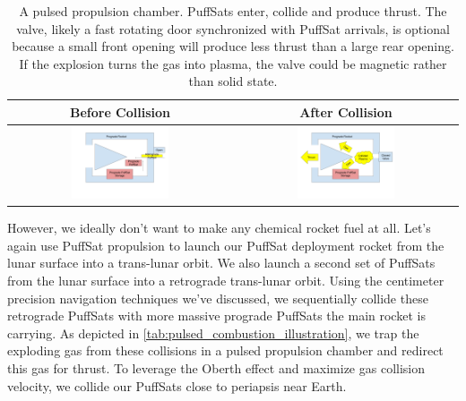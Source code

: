 \documentclass{article}
\begin{document}
{\begin{table}[htpb!]
    \centering
    \begin{tabular}{|c|c|}
        \hline
        Before Collision & After Collision \\\hline
        \includegraphics[width=0.45\textwidth]{images/Pulsed Propulsion Chamber Before Impact.png} &
        \includegraphics[width=0.45\textwidth]{images/_Pulsed Propulsion Chamber After Impact.png} \\ \hline
         
    \end{tabular}
    \caption{A pulsed propulsion chamber.   PuffSats enter, collide and produce thrust.   The valve, likely a fast rotating door synchronized with PuffSat arrivals, is optional because a small front opening will produce less thrust than a large rear opening.  If the explosion turns the gas into plasma, the valve could be magnetic rather than solid state.}
    \label{tab:pulsed_combustion_illustration}
\end{table}

However, we ideally don't want to make any chemical rocket fuel at all.   Let's again use PuffSat propulsion to launch our PuffSat deployment rocket from the lunar surface into a trans-lunar orbit.   We also launch a second set of PuffSats from the lunar surface into a retrograde trans-lunar orbit.   Using the centimeter precision navigation techniques we've discussed, we sequentially collide these retrograde PuffSats with more massive prograde PuffSats the main rocket is carrying.  As depicted in \autoref{tab:pulsed_combustion_illustration}, we trap the exploding gas from these collisions in a pulsed propulsion chamber and redirect this gas for thrust.   To leverage the Oberth effect and maximize gas collision velocity, we collide our PuffSats close to periapsis near Earth.

}
\end{document}
